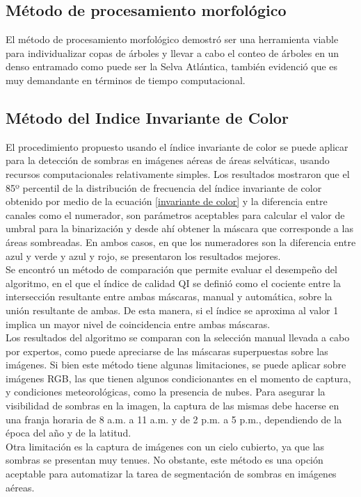 \subsection{Método de procesamiento morfológico}
El método de procesamiento morfológico demostró ser una herramienta viable para individualizar copas de árboles y llevar a cabo el conteo de árboles en un denso entramado como puede ser la Selva Atlántica, también evidenció que es muy demandante en términos de tiempo computacional.
\subsection{Método del Indice Invariante de Color} \label{Conclusiones}

El procedimiento propuesto usando el índice invariante de color se puede aplicar para la detección de sombras en imágenes aéreas de áreas selváticas, usando recursos computacionales relativamente simples. Los resultados mostraron que el 85º percentil de la distribución de frecuencia del índice invariante de color obtenido por medio de la ecuación \ref{invariante de color} y la diferencia entre canales como el numerador, son parámetros aceptables para calcular el valor de umbral para la binarización y desde ahí obtener la máscara que corresponde a las áreas sombreadas.
En ambos casos, en que los numeradores son la diferencia entre azul y verde y azul y rojo, se presentaron los resultados mejores. \\
Se encontró un método de comparación que permite evaluar el desempeño del algoritmo, en el que el índice de calidad QI se definió como el cociente entre la intersección resultante entre ambas máscaras, manual y automática, sobre la unión resultante de ambas. De esta manera, si el índice se aproxima al valor 1 implica un mayor nivel de coincidencia entre ambas máscaras. \\
Los resultados del algoritmo se comparan con la selección manual llevada a cabo por expertos, como puede apreciarse de las máscaras superpuestas sobre las imágenes. Si bien este método tiene algunas limitaciones, se puede aplicar sobre imágenes RGB, las que tienen algunos condicionantes en el momento de captura, y condiciones meteorológicas, como la presencia de nubes. Para asegurar la visibilidad de sombras en la imagen, la captura de las mismas debe hacerse en una franja horaria de 8 a.m. a 11 a.m. y de 2 p.m. a 5 p.m., dependiendo de la época del año y de la latitud. \\
Otra limitación es la captura de imágenes con un cielo cubierto, ya que las sombras se presentan muy tenues. No obstante, este método es una opción aceptable para automatizar la tarea de segmentación de sombras en imágenes aéreas.
